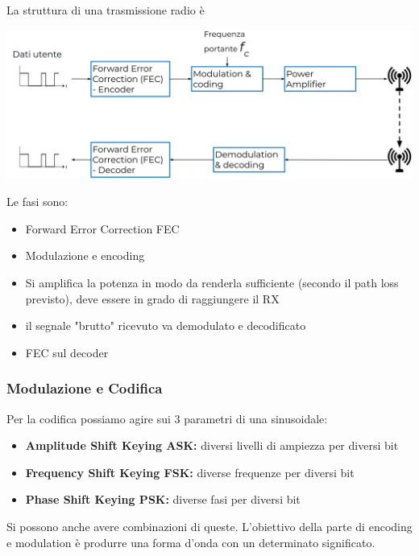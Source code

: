 La struttura di una trasmissione radio è
\begin{center}
	\includegraphics[width=0.95\linewidth]{img/wireless/struttrasmissione}
\end{center}

Le fasi sono: 
\begin{itemize}
	\item Forward Error Correction FEC
	
    \item Modulazione e encoding
	
    \item Si amplifica la potenza in modo da renderla sufficiente (secondo il path loss previsto), deve essere in grado di raggiungere il RX
	
    \item il segnale "brutto" ricevuto va demodulato e decodificato
	
    \item FEC sul decoder
\end{itemize}

\subsubsection{Modulazione e Codifica}
Per la codifica possiamo agire sui 3 parametri di una sinusoidale:
\begin{itemize}
	\item \textbf{Amplitude Shift Keying ASK:} diversi livelli di ampiezza per diversi bit

	\item \textbf{Frequency Shift Keying FSK:} diverse frequenze per diversi bit

	\item \textbf{Phase Shift Keying PSK:} diverse fasi per diversi bit
\end{itemize}

Si possono anche avere combinazioni di queste. L'obiettivo della parte di encoding e modulation è produrre una forma d'onda con un determinato significato.

